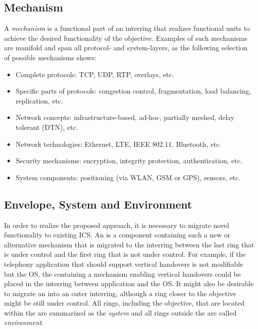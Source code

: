 \subsection{Mechanism}
A \emph{mechanism} is a functional part of an interring that realizes functional units to achieve the desired functionality of the objective.
Examples of such mechanisms are manifold and span all protocol- and system-layers, as the following selection of possible mechanisms shows:

\begin{itemize}
 \item Complete protocols: TCP, UDP, RTP, overlays, etc.
 \item Specific parts of protocols: congestion control, fragmentation, load balancing, replication, etc.
 \item Network concepts: infrastructure-based, ad-hoc, partially meshed, delay tolerant (DTN), etc.
 \item Network technologies: Ethernet, LTE, IEEE 802.11, Bluetooth, etc.
 \item Security mechanisms: encryption, integrity protection, authentication, etc.
 \item System components: positioning (via WLAN, GSM or GPS), sensors, etc.
\end{itemize}

 

\subsection{Envelope, System and Environment}
In order to realize the proposed approach, it is necessary to migrate novel functionality to existing ICS.
An \emph{\env} is a component containing such a new or alternative mechanism that is migrated to the interring between the last ring that is under control and the first ring that is not under control.
For example, if the telephony application that should support vertical handovers is not modifiable but the OS, the \env containing a mechanism enabling vertical handovers could be placed in the interring between application and the OS.
It might also be desirable to migrate an \env into an outer interring, although a ring closer to the objective might be still under control.
All rings, including the objective, that are located within the \env are summarized as the \emph{system} and all rings outside the \env are called \emph{environment}.

 
